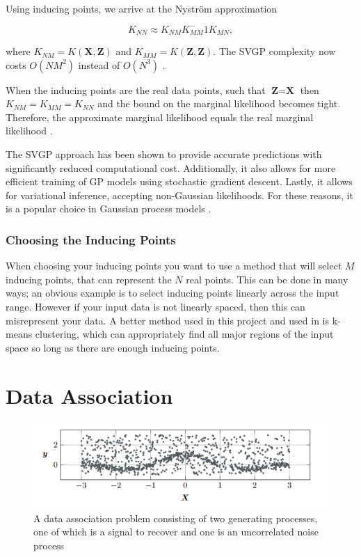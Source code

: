 \documentclass[12pt,a4paper]{report}
\theoremstyle{definition}
\begin{document}
Using inducing points, we arrive at the Nystr{\"o}m approximation

\begin{equation}
	K_{NN} \approx K_{NM} K_{MM}^-1 K_{MN},
\end{equation}

where $K_{NM} = K(\textbf{X}, \textbf{Z})$ and $K_{MM} = K(\textbf{Z}, \textbf{Z})$.
The SVGP complexity now costs $O(NM^2)$ instead of $O(N^3)$ \citep{Lui2021}.

When the inducing points are the real data points, such that $\textbf{Z} = \textbf{X}$ then $K_{NM} = K_{MM} = K_{NN}$ and the bound on the marginal likelihood becomes tight. 
Therefore, the approximate marginal likelihood equals the real marginal likelihood \citep{Hensman2015}.

The SVGP approach has been shown to provide accurate predictions with significantly reduced computational cost. 
Additionally, it also allows for more efficient training of GP models using stochastic gradient descent.
Lastly, it allows for variational inference, accepting non-Gaussian likelihoods.
For these reasons, it is a popular choice in Gaussian process models \citep{SVGPYi2020}.

\subsubsection{Choosing the Inducing Points}

When choosing your inducing points you want to use a method that will select $M$ inducing points, that can represent the $N$ real points.
This can be done in many ways; an obvious example is to select inducing points linearly across the input range. 
However if your input data is not linearly spaced, then this can misrepresent your data.
A better method used in this project and used in \citet{Hensman2015} is k-means clustering, which can appropriately find all major regions of the input space so long as there are enough inducing points.

\section{Data Association}

\begin{figure}[H]
    \centering
    \includegraphics[width=\linewidth]{data_association_problem.png}
    \caption{A data association problem consisting of two generating processes, one of which is a signal to recover and one is an uncorrelated noise process \citep{Kaiser2020}}
    \label{fig:DataAssocProblem}
\end{figure}
\end{document}
